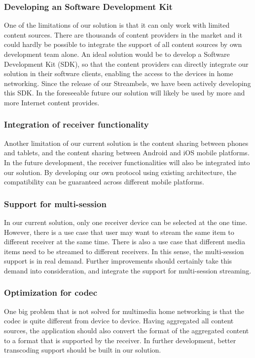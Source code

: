\subsubsection{Developing an Software Development Kit}
One of the limitations of our solution is that it can only work with limited content sources. There are thousands of content providers in the market and it could hardly be possible to integrate the support of all content sources by own development team alone. An ideal solution would be to develop a Software Development Kit (SDK), so that the content providers can directly integrate our solution in their software clients, enabling the access to the devices in home networking. Since the release of our Streambels, we have been actively developing this SDK. In the foreseeable future our solution will likely be used by more and more Internet content provides.
\subsubsection{Integration of receiver functionality}
Another limitation of our current solution is the content sharing between phones and tablets, and the content sharing between Android and iOS mobile platforms. In the future development, the receiver functionalities will also be integrated into our solution. By developing our own protocol using existing architecture, the compatibility can be guaranteed across different mobile platforms.
\subsubsection{Support for multi-session}
In our current solution, only one receiver device can be selected at the one time. However, there is a use case that user may want to stream the same item to different receiver at the same time. There is also a use case that different media items need to be streamed to different receivers. In this sense, the multi-session support is in real demand. Further improvements should certainly take this demand into consideration, and integrate the support for multi-session streaming.
\subsubsection{Optimization for codec}
One big problem that is not solved for multimedia home networking is that the codec is quite different from device to device. Having aggregated all content sources, the application should also convert the format of the aggregated content to a format that is supported by the receiver. In further development, better transcoding support should be built in our solution.
